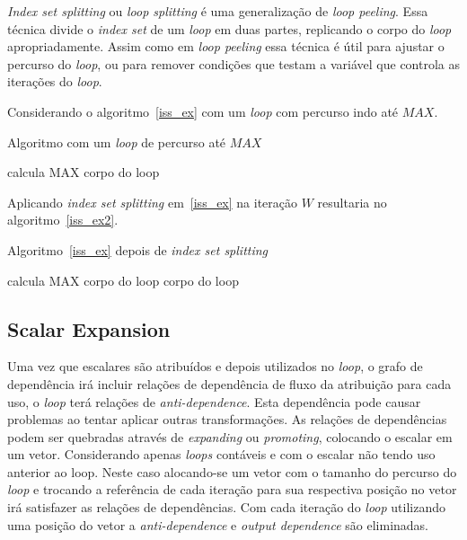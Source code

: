 \textit{Index set splitting} ou \textit{loop splitting} é uma generalização de 
\textit{loop peeling}. Essa técnica divide o \textit{index set} de um
\textit{loop} em duas partes, replicando o corpo do \textit{loop}
apropriadamente. 
Assim como em \textit{loop peeling} essa técnica é útil para ajustar o percurso
do \textit{loop}, ou para remover condições que testam a variável que controla
as iterações do \textit{loop}.

Considerando o algoritmo~\ref{iss_ex} com um \textit{loop} com percurso indo
até $MAX$.

\begin{algorithm}
\caption{Algoritmo com um \textit{loop} de percurso até $MAX$}
\label{iss_ex}
\begin{algorithmic}[1]

\STATE calcula MAX
\STATE corpo do loop
\ENDFOR

\end{algorithmic}
\end{algorithm}

Aplicando \textit{index set splitting} em~\ref{iss_ex} na iteração $W$
resultaria no algoritmo~\ref{iss_ex2}.

\begin{algorithm}
\caption{Algoritmo~\ref{iss_ex} depois de \textit{index set splitting}}
\label{iss_ex2}
\begin{algorithmic}[1]

\STATE calcula MAX
\STATE corpo do loop
\ENDFOR
{}
\STATE corpo do loop
\ENDFOR

\end{algorithmic}
\end{algorithm}


\subsection{Scalar Expansion} 

Uma vez que escalares são atribuídos e depois utilizados no \textit{loop}, o 
grafo de dependência irá incluir relações de dependência de fluxo da atribuição 
para cada uso, o \textit{loop} terá relações de \textit{anti-dependence}.
Esta dependência pode causar problemas ao tentar aplicar outras transformações.
As relações de dependências podem ser quebradas através de \textit{expanding} ou 
\textit{promoting}, colocando o escalar em um vetor.
Considerando apenas \textit{loops} contáveis e com o escalar não tendo uso
anterior ao loop. Neste caso alocando-se um vetor com o tamanho do percurso do
\textit{loop} e trocando a referência de cada iteração para sua respectiva
posição no vetor irá satisfazer as relações de dependências. Com cada iteração
do \textit{loop} utilizando uma posição do vetor a \textit{anti-dependence} e 
\textit{output dependence} são eliminadas.

